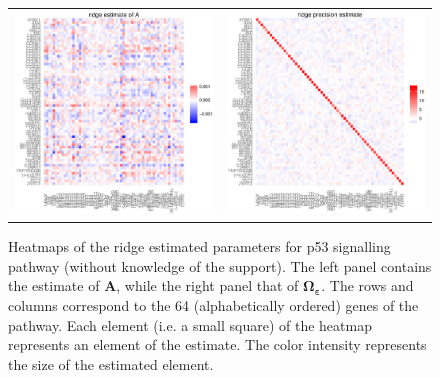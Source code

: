 \documentclass[a4paper]{article}
\begin{document}
\begin{figure}[h!]
\centering
\begin{tabular}{cc}
\includegraphics[scale=0.3]{Ahat_nonSparse.eps}
&
\includegraphics[scale=0.3]{Phat_nonSparse.eps}
\end{tabular}
\caption{Heatmaps of the ridge estimated parameters for p53 signalling pathway (without knowledge of the support). The left panel contains the estimate of $\mathbf{A}$, while the right panel that of $\boldsymbol{\Omega_{\varepsilon}}$. The rows and columns correspond to the 64 (alphabetically ordered) genes of the pathway. Each element (i.e. a small square) of the heatmap represents an element of the estimate. The color intensity represents the size of the estimated element.
}
\label{figSM:ridgeEstimates}
\end{figure}
\end{document}
